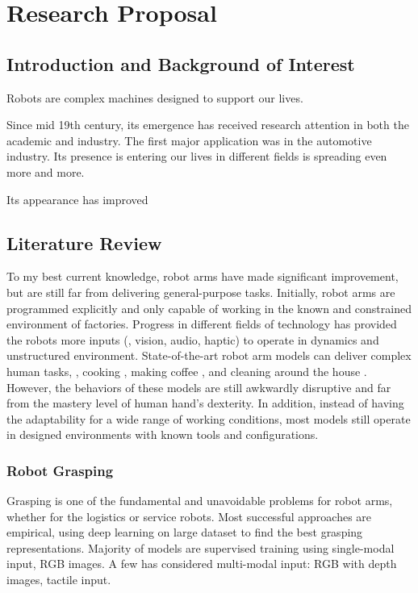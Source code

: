 \chapter{Research Proposal}

\section{Introduction and Background of Interest}


Robots are complex machines designed to support our lives.

Since mid 19th century, its emergence has received research attention in both the academic and industry. The first major application was in the automotive industry. Its presence is entering our lives in different fields is spreading even more and more.

Its appearance has improved 

\section{Literature Review}

To my best current knowledge, robot arms have made significant improvement, but are still far from delivering general-purpose tasks. Initially, robot arms are programmed explicitly and only capable of working in the known and constrained environment of factories. Progress in different fields of technology has provided the robots more inputs (\eg, vision, audio, haptic) to operate in dynamics and unstructured environment. State-of-the-art robot arm models can deliver complex human tasks, \eg, cooking \cite{moley}, making coffee \cite{coffeemaster}, and cleaning around the house \cite{bothandy}. However, the behaviors of these models are still awkwardly disruptive and far from the mastery level of human hand's dexterity. In addition, instead of having the adaptability for a wide range of working conditions, most models still operate in designed environments with known tools and configurations.

\subsection{Robot Grasping}

Grasping is one of the fundamental and unavoidable problems for robot arms, whether for the logistics or service robots. Most successful approaches are empirical, using deep learning on large dataset to find the best grasping representations. Majority of models are supervised training using single-modal input, \ie RGB images. A few has considered multi-modal input: RGB with depth images, tactile input. \cite{caldera2018review}

